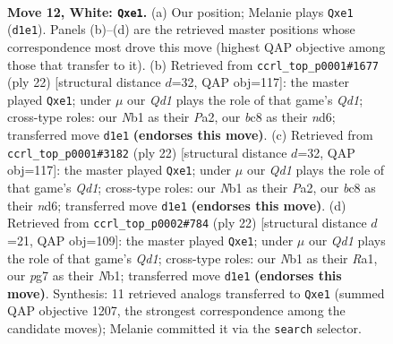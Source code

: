 \documentclass[11pt]{article}
\begin{document}
\clearpage

\begin{figure}[p]\centering
\begin{subfigure}{0.46\textwidth}\centering
\resizebox{\linewidth}{!}{%
\newchessgame
\chessboard[
  setfen={r1bq2k1/pppp1ppp/3n1b2/3P4/8/8/PPP2PPP/RNBQrBK1 w - - 0 12},
  showmover=false,
  pgfstyle=straightmove, color=movearrow, markmove={d1-e1}
]}
\caption{}
\end{subfigure}\hfill
\begin{subfigure}{0.46\textwidth}\centering
\resizebox{\linewidth}{!}{%
\newchessgame
\chessboard[
  setfen={r1bq2k1/pppp1ppp/3n1b2/3N4/8/8/PPPP1PPP/R1BQrBK1 w - - 0 12},
  showmover=false,
  pgfstyle=straightmove, color=movearrow, markmove={d1-e1}
]}
\caption{}
\end{subfigure}
\\[4pt]
\begin{subfigure}{0.46\textwidth}\centering
\resizebox{\linewidth}{!}{%
\newchessgame
\chessboard[
  setfen={r1bq2k1/pppp1ppp/3n1b2/3N4/8/8/PPPP1PPP/R1BQrBK1 w - - 0 12},
  showmover=false,
  pgfstyle=straightmove, color=movearrow, markmove={d1-e1}
]}
\caption{}
\end{subfigure}\hfill
\begin{subfigure}{0.46\textwidth}\centering
\resizebox{\linewidth}{!}{%
\newchessgame
\chessboard[
  setfen={r1bq2k1/pppp1ppp/3n1b2/8/3P4/2P5/PP3PPP/RNBQrBK1 w - - 0 12},
  showmover=false,
  pgfstyle=straightmove, color=movearrow, markmove={d1-e1}
]}
\caption{}
\end{subfigure}
\caption{\textbf{Move 12, White: \texttt{Qxe1}.} (a) Our position; Melanie plays \texttt{Qxe1} (\texttt{d1e1}). Panels (b)--(d) are the retrieved master positions whose correspondence most drove this move (highest QAP objective among those that transfer to it). (b) Retrieved from \texttt{ccrl\_top\_p0001\#1677} (ply 22) [structural distance $d$=32, QAP obj=117]: the master played \texttt{Qxe1}; under $\mu$ our \emph{Qd1} plays the role of that game's \emph{Qd1}; cross-type roles: our \emph{N}b1 as their \emph{P}a2, our \emph{b}c8 as their \emph{n}d6; transferred move \texttt{d1e1} \textbf{(endorses this move)}. (c) Retrieved from \texttt{ccrl\_top\_p0001\#3182} (ply 22) [structural distance $d$=32, QAP obj=117]: the master played \texttt{Qxe1}; under $\mu$ our \emph{Qd1} plays the role of that game's \emph{Qd1}; cross-type roles: our \emph{N}b1 as their \emph{P}a2, our \emph{b}c8 as their \emph{n}d6; transferred move \texttt{d1e1} \textbf{(endorses this move)}. (d) Retrieved from \texttt{ccrl\_top\_p0002\#784} (ply 22) [structural distance $d$=21, QAP obj=109]: the master played \texttt{Qxe1}; under $\mu$ our \emph{Qd1} plays the role of that game's \emph{Qd1}; cross-type roles: our \emph{N}b1 as their \emph{R}a1, our \emph{p}g7 as their \emph{N}b1; transferred move \texttt{d1e1} \textbf{(endorses this move)}. Synthesis: 11 retrieved analogs transferred to \texttt{Qxe1} (summed QAP objective 1207, the strongest correspondence among the candidate moves); Melanie committed it via the \texttt{search} selector.}
\label{fig:thought-m22}
\end{figure}
\end{document}
